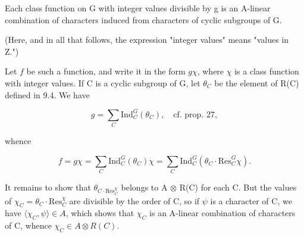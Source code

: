 Each class function on G with integer values divisible by g is an A-linear combination of characters induced from characters of cyclic subgroups of G.

(Here, and in all that follows, the expression "integer values" means "values in Z.")

Let $f$ be such a function, and write it in the form $g\chi$, where $\chi$ is a class function with integer values. If C is a cyclic subgroup of G, let $\theta_C$ be the element of R(C) defined in 9.4. We have

$$g = \sum_C \text{Ind}_C^G(\theta_C), \quad \text{cf. prop. 27},$$

whence

$$f = g\chi = \sum_C \text{Ind}_C^G(\theta_C)\chi = \sum_C \text{Ind}_C^G(\theta_C \cdot \text{Res}_C^G\chi).$$

It remains to show that $\theta_{C \cdot \text{Res}_C^\chi}$ belongs to A $\otimes$ R(C) for each C. But the values of $\chi_C = \theta_C \cdot \text{Res}_C^\chi$ are divisible by the order of C, so if $\psi$ is a character of C, we have $\langle \chi_C, \psi \rangle \in A$, which shows that $\chi_C$ is an A-linear combination of characters of C, whence $\chi_C \in A \otimes R(C)$.
